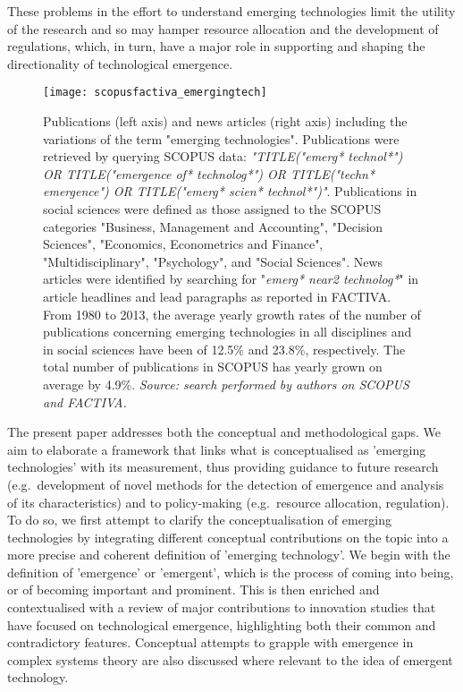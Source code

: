 \documentclass[11pt]{article}
\begin{document}
These problems in the effort to understand emerging technologies limit the utility of the research and so may hamper resource allocation and the development of regulations, which, in turn, have a major role in supporting and shaping the directionality of technological emergence.

\begin{figure}[h]
\texttt{[image: scopusfactiva\_emergingtech]}
\centering
\caption{Publications (left axis) and news articles (right axis) including the variations of the term "emerging technologies". Publications were retrieved by querying SCOPUS data: \textit{"TITLE("emerg* technol*") OR TITLE("emergence of* technolog*") OR TITLE("techn* emergence") OR TITLE("emerg* scien* technol*")"}. Publications in social sciences were defined as those assigned to the SCOPUS categories "Business, Management and Accounting", "Decision Sciences", "Economics, Econometrics and Finance", "Multidisciplinary", "Psychology", and "Social Sciences". News articles were identified by searching for "\textit{emerg* near2 technolog*}" in article headlines and lead paragraphs as reported in FACTIVA. From 1980 to 2013, the average yearly growth rates of the number of publications concerning emerging technologies in all disciplines and in social sciences have been of 12.5\% and 23.8\%, respectively. The total number of publications in SCOPUS has yearly grown on average by 4.9\%. \newline\textit{Source: search performed by authors on SCOPUS and FACTIVA.}}
\label{fig:scopus}
\end{figure}


The present paper addresses both the conceptual and methodological gaps. We aim to elaborate a framework that links what is conceptualised as 'emerging technologies' with its measurement, thus providing guidance to future research (e.g.\ development of novel methods for the detection of emergence and analysis of its characteristics) and to policy-making (e.g.\ resource allocation, regulation). To do so, we first attempt to clarify the conceptualisation of emerging technologies by integrating different conceptual contributions on the topic into a more precise and coherent definition of 'emerging technology'. We begin with the definition of 'emergence' or 'emergent', which is the process of coming into being, or of becoming important and prominent. This is then enriched and contextualised with a review of major contributions to innovation studies that have focused on technological emergence, highlighting both their common and contradictory features. Conceptual attempts to grapple with emergence in complex systems theory are also discussed where relevant to the idea of emergent technology.  
\end{document}
